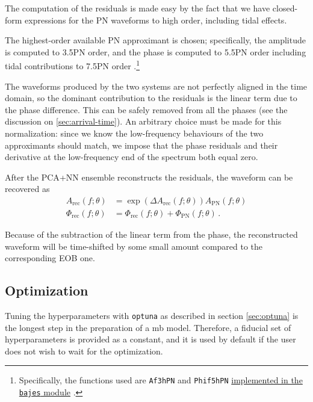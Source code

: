 \documentclass[main.tex]{subfiles}
\begin{document}
The computation of the residuals is made easy by the fact that we have closed-form expressions for the \ac{PN} waveforms to high order, including tidal effects.

The highest-order available \ac{PN} approximant is chosen; specifically, the amplitude is computed to 3.5PN order, and the phase is computed to 5.5PN order including tidal contributions to 7.5PN order \cite{favataSystematicParameterErrors2014}.\footnote{Specifically, the functions used are \texttt{Af3hPN} and \texttt{Phif5hPN} \href{https://github.com/matteobreschi/bajes/blob/stable/v0.1/bajes/obs/gw/approx/taylorf2.py}{implemented in the \texttt{bajes} module} \cite[]{breschiTtBajesBayesian2021}.}

The waveforms produced by the two systems are not perfectly aligned in the time domain, so the dominant contribution to the residuals is the linear term due to the phase difference. This can be safely removed from all the phases (see the discussion on \ref{sec:arrival-time}). 
An arbitrary choice must be made for this normalization: since we know the low-frequency behaviours of the two approximants should match, we impose that the phase residuals and their derivative at the low-frequency end of the spectrum both equal zero.

After the \ac{PCA}+\ac{NN} ensemble reconstructs the residuals, the waveform can be recovered as 
%
\begin{align}\label{eq:amplitude-phase-reconstruction}
A _{\text{rec}} (f; \theta ) &= \exp( \Delta A _{\text{rec}} (f; \theta )) A _{\text{PN}}(f; \theta )  \\
\Phi _{\text{rec}} (f; \theta ) &= \Phi _{\text{rec}}(f; \theta ) + \Phi _{\text{PN}}(f; \theta )
\,.
\end{align}

Because of the subtraction of the linear term from the phase, the reconstructed waveform will be time-shifted by some small amount compared to the corresponding \ac{EOB} one. 

\subsection{Optimization}

Tuning the hyperparameters with \texttt{optuna} as described in section \ref{sec:optuna} is the longest step in the preparation of a \ac{mb} model. 
Therefore, a fiducial set of hyperparameters is provided as a constant, and it is used by default if the user does not wish to wait for the optimization. 
\end{document}
